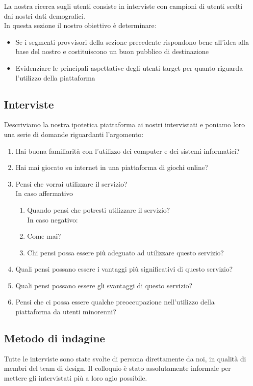 \documentclass[../Report.tex]{subfiles}
\begin{document}
    La nostra ricerca sugli utenti consiste in interviste con campioni di utenti scelti dai nostri dati demografici.\\
    In questa sezione il nostro obiettivo è determinare:
    \begin{itemize}
        \item Se i segmenti provvisori della sezione precedente rispondono bene all’idea alla base del nostro e costituiscono un buon pubblico di destinazione
        \item Evidenziare le principali aspettative degli utenti target per quanto riguarda l’utilizzo della piattaforma
    \end{itemize}

    
    \subsection{Interviste}
    Descriviamo la nostra ipotetica piattaforma ai nostri intervistati e poniamo loro una serie di domande riguardanti l’argomento:
   
    \begin{enumerate}
    \item Hai buona familiarità con l’utilizzo dei computer e dei sistemi informatici?
    \item Hai mai giocato su internet in una piattaforma di giochi online?
    \item Pensi che vorrai utilizzare il servizio?\\
         In caso affermativo\\
        \begin{enumerate}
            \item Quando pensi che potresti utilizzare il servizio?\\ 
             In caso negativo: 
            \item Come mai?
            \item Chi pensi possa essere più adeguato ad utilizzare questo servizio?
        \end{enumerate}
    \item	Quali pensi possano essere i vantaggi più significativi di questo servizio?
    \item	Quali pensi possano essere gli svantaggi di questo servizio?
    \item	Pensi che ci possa essere qualche preoccupazione nell’utilizzo della piattaforma da utenti minorenni?
    \end{enumerate}
    \subsection{Metodo di indagine}
    Tutte le interviste sono state svolte di persona direttamente da noi, in qualità di membri del team di design. Il colloquio è stato assolutamente informale per mettere gli intervistati più a loro agio possibile.
    
\end{document}
